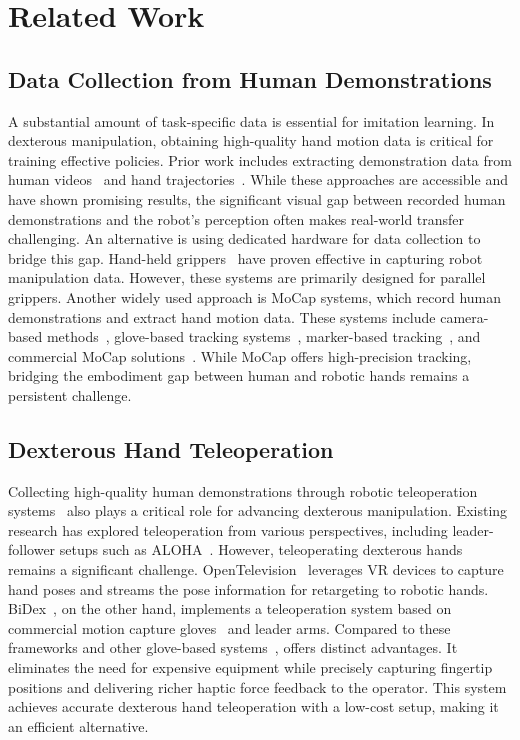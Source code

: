\section{Related Work}
\subsection{Data Collection from Human Demonstrations}
A substantial amount of task-specific data is essential for imitation learning. In dexterous manipulation, obtaining high-quality hand motion data is critical for training effective policies.
%
Prior work includes extracting demonstration data from human videos~\cite{sivakumar2022robotic,xu2023xskill,xu2024flow,bharadhwaj2024towards} and hand trajectories~\cite{wang2023mimicplay,yang2022learning}. While these approaches are accessible and have shown promising results, the significant visual gap between recorded human demonstrations and the robot’s perception often makes real-world transfer challenging.
%
An alternative is using dedicated hardware for data collection to bridge this gap. Hand-held grippers~\cite{song2020grasping,chi2024universal,sanches2023scalable} have proven effective in capturing robot manipulation data. However, these systems are primarily designed for parallel grippers.
%
Another widely used approach is MoCap systems, which record human demonstrations and extract hand motion data. These systems include camera-based methods~\cite{qin2023anyteleop,zimmermann2019freihand}, glove-based tracking systems~\cite{wang2024dexcap,liu2017glove,liu2019high}, marker-based tracking~\cite{zhao2012combining}, and commercial MoCap solutions~\cite{taheri2020grab,fan2023arctic}. While MoCap offers high-precision tracking, bridging the embodiment gap between human and robotic hands remains a persistent challenge.

\subsection{Dexterous Hand Teleoperation} 
Collecting high-quality human demonstrations through robotic teleoperation systems~\cite{fang2024airexo,cheng2024open,ding2024bunny,iyer2024open} also plays a critical role for advancing dexterous manipulation.
Existing research has explored teleoperation from various perspectives, including leader-follower setups such as ALOHA~\cite{zhao2023learning,zhao2024aloha,fu2024mobile,aldaco2024aloha}.
%
However, teleoperating dexterous hands remains a significant challenge.
OpenTelevision~\cite{cheng2024open} leverages VR devices to capture hand poses and streams the pose information for retargeting to robotic hands. BiDex~\cite{shawbimanual}, on the other hand, implements a teleoperation system based on commercial motion capture gloves~\cite{manusmeta} and leader arms. 
Compared to these frameworks and other glove-based systems~\cite{liu2017glove,liu2019high}, \oursystem offers distinct advantages. It eliminates the need for expensive equipment while precisely capturing fingertip positions and delivering richer haptic force feedback to the operator. This system achieves accurate dexterous hand teleoperation with a low-cost setup, making it an efficient alternative.

